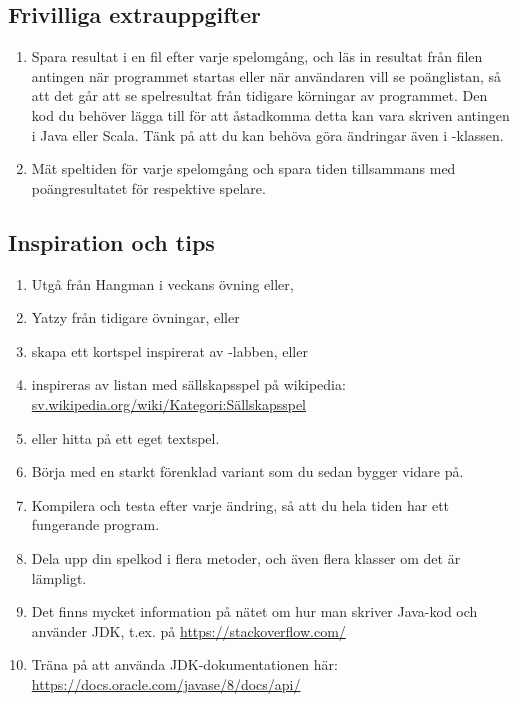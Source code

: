\subsection{Frivilliga extrauppgifter}

\begin{enumerate}
	\item Spara resultat i en fil efter varje spelomgång, och läs in resultat från filen antingen när programmet startas eller när användaren vill se poänglistan, så att det går att se spelresultat från tidigare körningar av programmet. Den kod du behöver lägga till för att åstadkomma detta kan vara skriven antingen i Java eller Scala. Tänk på att du kan behöva göra ändringar även i -klassen.
	\item   Mät speltiden för varje spelomgång och spara tiden tillsammans med poängresultatet för respektive spelare.

\end{enumerate}

\subsection{Inspiration och tips}

\begin{enumerate}
  \item Utgå från Hangman i veckans övning eller,
  \item Yatzy från tidigare övningar, eller
  \item skapa ett kortspel inspirerat av -labben, eller
  \item inspireras av listan med sällskapsspel på wikipedia:\\ \href{https://sv.wikipedia.org/wiki/Kategori:Sällskapsspel}{sv.wikipedia.org/wiki/Kategori:Sällskapsspel}
  \item eller hitta på ett eget textspel.
  \item Börja med en starkt förenklad variant som du sedan bygger vidare på.
  \item Kompilera och testa efter varje ändring, så att du hela tiden har ett fungerande program.
  \item Dela upp din spelkod i flera metoder, och även flera klasser om det är lämpligt.
  \item Det finns mycket information på nätet om hur man skriver Java-kod och använder JDK, t.ex. på \url{https://stackoverflow.com/}
  \item Träna på att använda JDK-dokumentationen här:\\ \url{https://docs.oracle.com/javase/8/docs/api/}
\end{enumerate}
